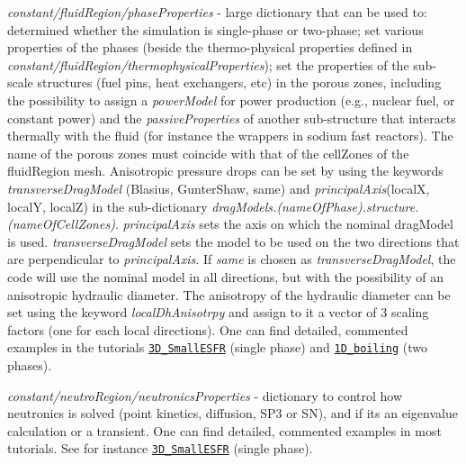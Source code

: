 \begin{DoxyItemize}
\item {\itshape constant/fluid\+Region/phase\+Properties} -\/ large dictionary that can be used to\+: determined whether the simulation is single-\/phase or two-\/phase; set various properties of the phases (beside the thermo-\/physical properties defined in {\itshape constant/fluid\+Region/thermophysical\+Properties}); set the properties of the sub-\/scale structures (fuel pins, heat exchangers, etc) in the porous zones, including the possibility to assign a {\itshape power\+Model} for power production (e.\+g., nuclear fuel, or constant power) and the {\itshape passive\+Properties} of another sub-\/structure that interacts thermally with the fluid (for instance the wrappers in sodium fast reactors). The name of the porous zones must coincide with that of the cell\+Zones of the fluid\+Region mesh. Anisotropic pressure drops can be set by using the keywords {\itshape transverse\+Drag\+Model} (Blasius, Gunter\+Shaw, same) and {\itshape principal\+Axis}(localX, localY, localZ) in the sub-\/dictionary {\itshape drag\+Models.(name\+Of\+Phase).structure.(name\+Of\+Cell\+Zones)}. {\itshape principal\+Axis} sets the axis on which the nominal drag\+Model is used. {\itshape transverse\+Drag\+Model} sets the model to be used on the two directions that are perpendicular to {\itshape principal\+Axis}. If {\itshape same} is chosen as {\itshape transverse\+Drag\+Model}, the code will use the nominal model in all directions, but with the possibility of an anisotropic hydraulic diameter. The anisotropy of the hydraulic diameter can be set using the keyword {\itshape local\+Dh\+Anisotrpy} and assign to it a vector of 3 scaling factors (one for each local directions). One can find detailed, commented examples in the tutorials \href{https://gitlab.com/foam-for-nuclear/GeN-Foam/-/tree/master/Tutorials/3D_SmallESFR/rootCase/constant/fluidRegion/phaseProperties}{\tt 3\+D\+\_\+\+Small\+E\+S\+FR} (single phase) and \href{https://gitlab.com/foam-for-nuclear/GeN-Foam/-/tree/master/Tutorials/1D_boiling/constant/fluidRegion/phaseProperties}{\tt 1\+D\+\_\+boiling} (two phases).
\item {\itshape constant/neutro\+Region/neutronics\+Properties} -\/ dictionary to control how neutronics is solved (point kinetics, diffusion, S\+P3 or SN), and if it\textquotesingle{}s an eigenvalue calculation or a transient. One can find detailed, commented examples in most tutorials. See for instance \href{https://gitlab.com/foam-for-nuclear/GeN-Foam/-/tree/master/Tutorials/3D_SmallESFR/rootCase/constant/neutroRegion/neutronicsProperties}{\tt 3\+D\+\_\+\+Small\+E\+S\+FR} (single phase).

\end{DoxyItemize}
